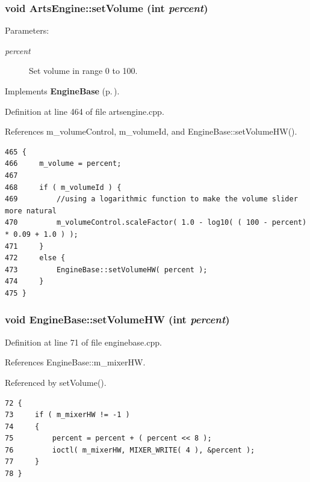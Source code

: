 \subsubsection{\setlength{\rightskip}{0pt plus 5cm}void Arts\-Engine::set\-Volume (int {\em percent})\hspace{0.3cm}{\tt  [virtual, slot]}}\label{classArtsEngine_ArtsEnginei5}


\begin{Desc}
\item[Parameters:]
\begin{description}
\item[{\em percent}]Set volume in range 0 to 100. \end{description}
\end{Desc}


Implements {\bf Engine\-Base} {\rm (p.\,\pageref{classEngineBase_EngineBasei4})}.

Definition at line 464 of file artsengine.cpp.

References m\_\-volume\-Control, m\_\-volume\-Id, and Engine\-Base::set\-Volume\-HW().



\footnotesize\begin{verbatim}465 {
466     m_volume = percent;
467 
468     if ( m_volumeId ) {
469         //using a logarithmic function to make the volume slider more natural
470         m_volumeControl.scaleFactor( 1.0 - log10( ( 100 - percent) * 0.09 + 1.0 ) );
471     }
472     else {
473         EngineBase::setVolumeHW( percent );
474     }
475 }
\end{verbatim}\normalsize 
{}
\subsubsection{\setlength{\rightskip}{0pt plus 5cm}void Engine\-Base::set\-Volume\-HW (int {\em percent})\hspace{0.3cm}{\tt  [protected, inherited]}}\label{classEngineBase_EngineBaseb2}




Definition at line 71 of file enginebase.cpp.

References Engine\-Base::m\_\-mixer\-HW.

Referenced by set\-Volume().



\footnotesize\begin{verbatim}72 {
73     if ( m_mixerHW != -1 )
74     {
75         percent = percent + ( percent << 8 );
76         ioctl( m_mixerHW, MIXER_WRITE( 4 ), &percent );
77     }
78 }
\end{verbatim}\normalsize 
{}
